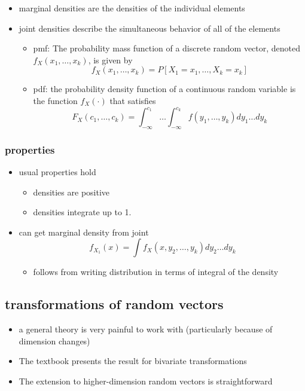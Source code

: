\documentclass[11pt]{article}
\begin{document}
\begin{itemize}
\item marginal densities are the densities of the individual elements
\item joint densities describe the simultaneous behavior of all of
        the elements
\begin{itemize}
\item pmf: The probability mass function of a discrete random vector,
          denoted $f_X(x_1,\dots, x_k)$, is given by 
          \[f_X(x_1,\dots,x_k) = P[X_1 = x_1,\dots,X_k = x_k]\]
\item pdf: the probability density function of a continuous random
          variable is the function $f_X(\cdot)$ that satisfies
          \[ F_X(c_1,\dotsc,c_k) = \int_{-\infty}^{c_1} \dots
          \int_{-\infty}^{c_k} f(y_1,\dots,y_k) dy_1 \dots dy_k \]
\end{itemize}
\end{itemize}
\subsubsection{properties}
\label{sec-2-1-2}

\begin{itemize}
\item usual properties hold
\begin{itemize}
\item densities are positive
\item densities integrate up to 1.
\end{itemize}
\item can get marginal density from joint
        \[ f_{X_1}(x) = \int f_X(x, y_2,\dots,y_k) dy_2 \dots dy_k \]
\begin{itemize}
\item follows from writing distribution in terms of integral of
          the density
\end{itemize}
\end{itemize}
\subsection{transformations of random vectors}
\label{sec-2-2}

\begin{itemize}
\item a general theory is very painful to work with (particularly
        because of dimension changes)
\item The textbook presents the result for bivariate transformations
\item The extension to higher-dimension random vectors is
        straightforward
\end{itemize}
\end{document}
